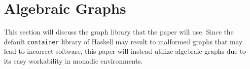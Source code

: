 \section{Algebraic Graphs}
This section will discuss the graph library that the paper will use.
Since the default \verb|container| library of Haskell may result to 
malformed graphs that may lead to incorrect software, this paper will 
instead utilize algebraic graphs due to its easy workability in monadic 
environments.\cite{Mokhov2017,Marlow2013}






